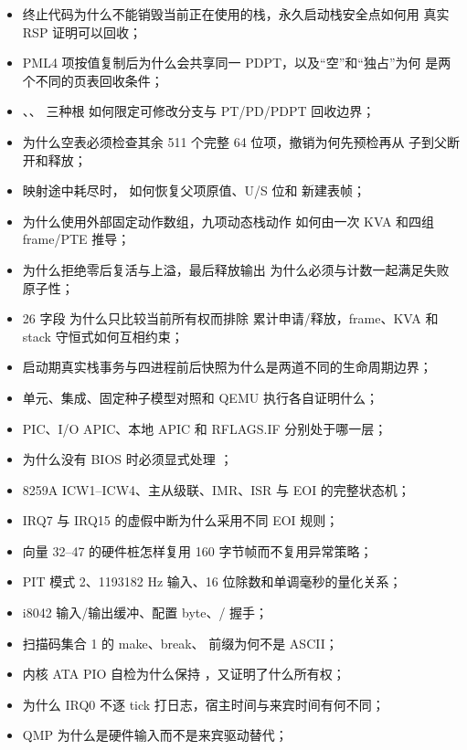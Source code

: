 \begin{itemize}
        如何组成六页布局，为什么虚拟连续不要求物理帧连续；
  \item 终止代码为什么不能销毁当前正在使用的栈，永久启动栈安全点如何用
        真实 RSP 证明可以回收；
  \item PML4 项按值复制后为什么会共享同一 PDPT，以及“空”和“独占”为何
        是两个不同的页表回收条件；
  \item {}、、 三种根
        如何限定可修改分支与 PT/PD/PDPT 回收边界；
  \item 为什么空表必须检查其余 511 个完整 64 位项，撤销为何先预检再从
        子到父断开和释放；
  \item 映射途中耗尽时， 如何恢复父项原值、U/S 位和
        新建表帧；
  \item {} 为什么使用外部固定动作数组，九项动态栈动作
        如何由一次 KVA 和四组 frame/PTE 推导；
  \item {} 为什么拒绝零后复活与上溢，最后释放输出
        为什么必须与计数一起满足失败原子性；
  \item 26 字段  为什么只比较当前所有权而排除
        累计申请/释放，frame、KVA 和 stack 守恒式如何互相约束；
  \item 启动期真实栈事务与四进程前后快照为什么是两道不同的生命周期边界；
  \item 单元、集成、固定种子模型对照和 QEMU 执行各自证明什么；
  \item PIC、I/O APIC、本地 APIC 和 RFLAGS.IF 分别处于哪一层；
  \item 为什么没有 BIOS 时必须显式处理 ；
  \item 8259A ICW1--ICW4、主从级联、IMR、ISR 与 EOI 的完整状态机；
  \item IRQ7 与 IRQ15 的虚假中断为什么采用不同 EOI 规则；
  \item 向量 32--47 的硬件桩怎样复用 160 字节帧而不复用异常策略；
  \item PIT 模式 2、1193182 Hz 输入、16 位除数和单调毫秒的量化关系；
  \item i8042 输入/输出缓冲、配置 byte、/ 握手；
  \item 扫描码集合 1 的 make、break、 前缀为何不是 ASCII；
  \item 内核 ATA PIO 自检为什么保持 ，又证明了什么所有权；
  \item 为什么 IRQ0 不逐 tick 打日志，宿主时间与来宾时间有何不同；
  \item QMP  为什么是硬件输入而不是来宾驱动替代；

\end{itemize}

